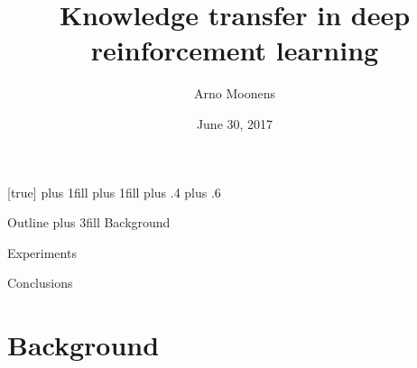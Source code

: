 
\usepackage{hyperref}


\title{Knowledge transfer in deep reinforcement learning}
\author{Arno Moonens}
\date{June 30, 2017}

\makeatletter
{}[true]{%
  \beamer@frametopskip=0pt plus 1fill\relax%
  \beamer@framebottomskip=0pt plus 1fill\relax%
  \beamer@frametopskipautobreak=0pt plus .4\paperheight\relax%
  \beamer@framebottomskipautobreak=0pt plus .6\paperheight\relax%
  \def\beamer@initfirstlineunskip{}%
}
\makeatother

\let\oldfootnotesize\footnotesize
\renewcommand*{\footnotesize}{\oldfootnotesize\tiny}


\AtBeginPart{\frame{\partpage}}

\graphicspath{ {../images/} }

\makeatletter
\def\beamer@framenotesbegin{%
  \gdef\beamer@noteitems{}%
  \gdef\beamer@notes{{}}%
}
\makeatother


\frame{\titlepage}

\begin{frame}{Outline}
    \vskip0pt plus 3fill
  {\color{vubbleu}\large Background}
  \tableofcontents[part=1]

  {\color{vubbleu}\large Experiments}
  \tableofcontents[part=2]

  {\color{vubbleu}\large Conclusions}
  \tableofcontents[part=3]
\end{frame}

\part{Background}

